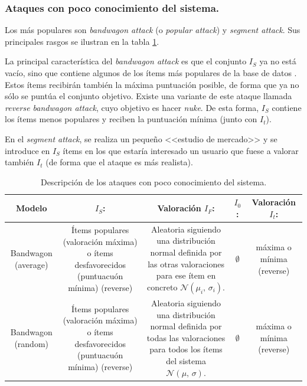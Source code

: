\subsubsection{Ataques con poco conocimiento del sistema.}

Los más populares son \textit{bandwagon attack} (o \textit{popular attack}) y \textit{segment attack}. Sus principales rasgos se ilustran en la tabla \ref{tabla_descripcion_ataques_poco_con}.

La principal característica del \textit{bandwagon attack} es que el conjunto $I_S$ ya no está vacío, sino que contiene algunos de los ítems más populares de la base de datos \cite{zhou2021SemisupervisedRecommendationAttack}. Estos ítems recibirán también la máxima puntuación posible, de forma que ya no sólo se puntúa el conjunto objetivo. Existe una variante de este ataque llamada \textit{reverse bandwagon attack}, cuyo objetivo es hacer \textit{nuke}. De esta forma, $I_S$ contiene los ítems menos populares y reciben la puntuación mínima (junto con $I_t$).

En el \textit{segment attack}, se realiza un pequeño <<estudio de mercado>> y se introduce en $I_S$ ítems en los que estaría interesado un usuario que fuese a valorar también $I_t$ (de forma que el ataque es más realista).

\begin{table}
	\centering
	\resizebox{15cm}{!} {
		\begin{tabular}{|c c c c c|}
			\hline
			
			Modelo & \textbf{$I_S$:} & Valoración \textbf{$I_F$:} & \textbf{$I_0$:} & Valoración \textbf{$I_t$:} \\\hline \hline
			
			\parbox{5em}{Bandwagon (average)} & \parbox{10em} {Ítems populares (valoración máxima) o ítems desfavorecidos (puntuacuón mínima) (reverse)} & \parbox{10em}{Aleatoria siguiendo una distribución normal definida por las otras valoraciones para ese ítem en concreto $\mathcal{N}(\mu_i,\,\sigma_i)$.} & $\emptyset$ & \parbox{5em}{máxima o mínima (reverse)} \\\hline
			
			\parbox{5em}{Bandwagon (random)} & \parbox{10em}{Ítems populares (valoración máxima) o ítems desfavorecidos (puntuacuón mínima) (reverse)} & \parbox{10em}{Aleatoria siguiendo una distribución normal definida por todas las valoraciones para todos los ítems del sistema $\mathcal{N}(\mu,\,\sigma)$.} & $\emptyset$ & \parbox{5em}{máxima o mínima (reverse)} \\\hline
		\end{tabular}
	}
	
	\caption{Descripción de los ataques con poco conocimiento del sistema.}
	\label{tabla_descripcion_ataques_poco_con}
\end{table}


